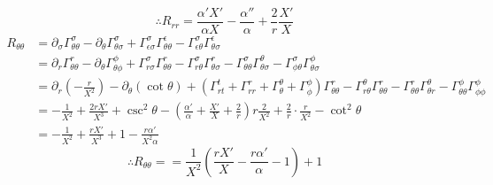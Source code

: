 \documentclass[12pt]{report}
\begin{document}
	\begin{equation}
		\therefore \boxed{R_{rr}=\frac{\alpha'X'}{\alpha X} - \frac{\alpha''}{\alpha} + \frac{2}{r}\frac{X'}{X} }
	\end{equation}
	\begin{align*}
		R_{\theta\theta} &= \partial_\sigma\Gamma^{\sigma}_{\theta\theta} - \partial_\theta\Gamma^{\sigma}_{\theta\sigma} + \Gamma^{\sigma}_{\epsilon\sigma}\Gamma^{\epsilon}_{\theta\theta} - \Gamma^{\sigma}_{\epsilon\theta}\Gamma^{\epsilon}_{\theta\sigma}\\
		&= \partial_r\Gamma^r_{\theta\theta} - \partial_\theta\Gamma^{\phi}_{\theta\phi} + \Gamma^{\sigma}_{r\sigma}\Gamma^r_{\theta\theta} - \Gamma^{\sigma}_{r\theta}\Gamma^{r}_{{\theta\sigma}} - \Gamma^{\sigma}_{\theta\theta}\Gamma^{\theta}_{\theta\sigma} - \Gamma^{\sigma}_{\phi\theta}\Gamma^{\phi}_{\theta\sigma} \\
		& = \partial_r\left(-\frac{r}{X^2}\right) - \partial_\theta(\cot\theta) + \left(\Gamma^t_{rt} + \Gamma^r_{rr} + \Gamma^{\theta}_{\theta} + \Gamma^{\phi}_{\phi}\right)\Gamma^r_{\theta\theta}
		-\Gamma^{\theta}_{r\theta}\Gamma^{r}_{\theta\theta} - \Gamma^{r}_{\theta\theta}\Gamma^{\theta}_{\theta r} - \Gamma^{\phi}_{\theta\theta}\Gamma^{\phi}_{\phi\phi} \\
		&= -\frac{1}{X^2} + \frac{2rX'}{X^3} + \csc^2\theta - \left(\frac{\alpha'}{\alpha}+\frac{X'}{X}+\frac{2}{r}\right)r\frac{2}{X^2} + \frac{2}{r}\cdot\frac{r}{X^2} 
		-\cot^2\theta \\
		&= -\frac{1}{X^2} + \frac{rX'}{X^3} + 1 - \frac{r\alpha'}{X^2\alpha} 
	\end{align*}
	\begin{equation}
		\therefore \boxed{R_{\theta\theta}== \frac{1}{X^2}\left(\frac{rX'}{X} - \frac{r\alpha'}{\alpha} - 1\right) + 1}
	\end{equation}
\end{document}

